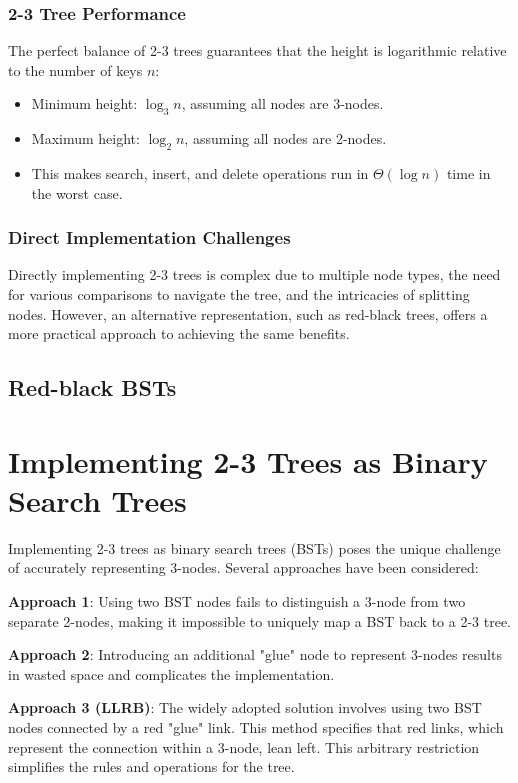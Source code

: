\documentclass{article}
\begin{document}
\subsubsection{2-3 Tree Performance}
The perfect balance of 2-3 trees guarantees that the height is logarithmic relative to the number of keys $n$:
\begin{itemize}
    \item Minimum height: $\log_{3} n$, assuming all nodes are 3-nodes.
    \item Maximum height: $\log_{2} n$, assuming all nodes are 2-nodes.
    \item This makes search, insert, and delete operations run in $\Theta(\log n)$ time in the worst case.
\end{itemize}

\subsubsection{Direct Implementation Challenges}
Directly implementing 2-3 trees is complex due to multiple node types, the need for various comparisons to navigate the tree, and the intricacies of splitting nodes. However, an alternative representation, such as red-black trees, offers a more practical approach to achieving the same benefits.

\subsection{Red-black BSTs}

\section*{Implementing 2-3 Trees as Binary Search Trees}

Implementing 2-3 trees as binary search trees (BSTs) poses the unique challenge of accurately representing 3-nodes. Several approaches have been considered:

\textbf{Approach 1}: Using two BST nodes fails to distinguish a 3-node from two separate 2-nodes, making it impossible to uniquely map a BST back to a 2-3 tree.

\textbf{Approach 2}: Introducing an additional "glue" node to represent 3-nodes results in wasted space and complicates the implementation.

\textbf{Approach 3 (LLRB)}: The widely adopted solution involves using two BST nodes connected by a red "glue" link. This method specifies that red links, which represent the connection within a 3-node, lean left. This arbitrary restriction simplifies the rules and operations for the tree.
\end{document}
